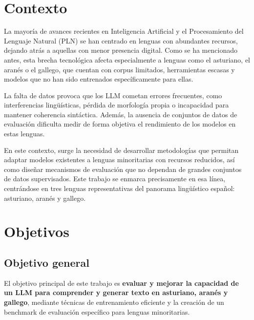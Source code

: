 \section{Contexto}

La mayoría de avances recientes en Inteligencia Artificial y el Procesamiento del Lenguaje Natural (PLN) se han centrado en lenguas con abundantes recursos, dejando atrás a aquellas con menor presencia digital. Como se ha mencionado antes, esta brecha tecnológica afecta especialmente a lenguas como el asturiano, el aranés o el gallego, que cuentan con corpus limitados, herramientas escasas y modelos que no han sido entrenados específicamente para ellas.

La falta de datos provoca que los LLM cometan errores frecuentes, como interferencias lingüísticas, pérdida de morfología propia o incapacidad para mantener coherencia sintáctica. Además, la ausencia de conjuntos de datos de evaluación dificulta medir de forma objetiva el rendimiento de los modelos en estas lenguas.

En este contexto, surge la necesidad de desarrollar metodologías que permitan adaptar modelos existentes a lenguas minoritarias con recursos reducidos, así como diseñar mecanismos de evaluación que no dependan de grandes conjuntos de datos supervisados. Este trabajo se enmarca precisamente en esa línea, centrándose en tres lenguas representativas del panorama lingüístico español: asturiano, aranés y gallego.


\section{Objetivos}

\subsection{Objetivo general}
El objetivo principal de este trabajo es \textbf{evaluar y mejorar la capacidad de un LLM para comprender y generar texto en asturiano, aranés y gallego}, mediante técnicas de entrenamiento eficiente y la creación de un benchmark de evaluación específico para lenguas minoritarias.

